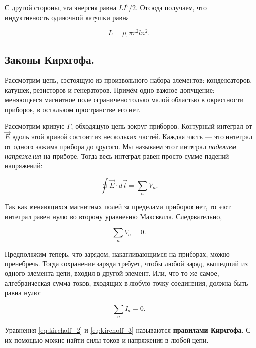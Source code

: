 \documentclass[11pt,a4paper]{article}
\numberwithin{equation}{section}
\begin{document}
С другой стороны, эта энергия равна $LI^2/2$. Отсюда получаем, что
индуктивность одиночной катушки равна

\begin{equation}
  \label{eq:inductivity}
  L = \mu_0 \pi r^2 l n^2.
\end{equation}

\subsection{Законы Кирхгофа.}
\label{sec:kirchoff}

Рассмотрим цепь, состоящую из произвольного набора элементов:
конденсаторов, катушек, резисторов и генераторов. Примём одно важное
допущение: меняющееся магнитное поле ограничено только малой областью
в окрестности приборов, в остальном пространстве его нет.

Рассмотрим кривую $\Gamma$, обходящую цепь вокруг приборов. Контурный
интеграл от $\vec{E}$ вдоль этой кривой состоит из нескольких
частей. Каждая часть --- это интеграл от одного зажима прибора до
другого. Мы называем этот интеграл \textit{падением напряжения} на
приборе. Тогда весь интеграл равен просто сумме падений напряжений:

\begin{equation}
  \label{eq:kirchoff_1}
  \oint \vec{E} \cdot d \vec{l} = \sum_n V_n.
\end{equation}

Так как меняющихся магнитных полей за пределами приборов нет, то этот
интеграл равен нулю во второму уравнению Максвелла. Следовательно, 

\begin{equation}
  \label{eq:kirchoff_2}
  \sum_n V_n = 0. 
\end{equation}

Предположим теперь, что зарядом, накапливающимся на приборах, можно
пренебречь. Тогда сохранение заряда требует, чтобы любой заряд,
вышедший из одного элемента цепи, входил в другой элемент. Или, что то
же самое, алгебраическая сумма токов, входящих в любую точку
соединения, должна быть равна нулю:

\begin{equation}
  \label{eq:kirchoff_3}
  \sum_n I_n =0.
\end{equation}

Уравнения \eqref{eq:kirchoff_2} и \eqref{eq:kirchoff_3} называются
\textbf{правилами Кирхгофа}. С их помощью можно найти силы токов и
напряжения в любой цепи. 
\end{document}
